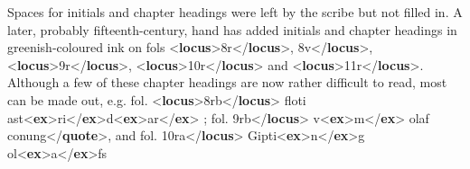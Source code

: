 \begin{shaded}
Spaces for initials and chapter headings were left by the scribe but not\mbox{}\newline 
\hspace*{1em}\hspace*{1em} filled in. A later, probably fifteenth-century, hand has added initials and\mbox{}\newline 
\hspace*{1em}\hspace*{1em} chapter headings in greenish-coloured ink on fols {<\textbf{locus}>}8r{</\textbf{locus}>},\mbox{}\newline 
{}8v{</\textbf{locus}>}, {<\textbf{locus}>}9r{</\textbf{locus}>}, {<\textbf{locus}>}10r{</\textbf{locus}>} and {<\textbf{locus}>}11r{</\textbf{locus}>}.\mbox{}\newline 
\hspace*{1em}\hspace*{1em} Although a few of these chapter headings are now rather difficult to read, most\mbox{}\newline 
\hspace*{1em}\hspace*{1em} can be made out, e.g. fol. {<\textbf{locus}>}8rb{</\textbf{locus}>}\mbox{}\newline 
\hspace*{1em}floti ast{<\textbf{ex}>}ri{</\textbf{ex}>}d{<\textbf{ex}>}ar{</\textbf{ex}>}\mbox{}\newline 
\hspace*{1em}; fol.\mbox{}\newline 
{}9rb{</\textbf{locus}>}\mbox{}\newline 
\hspace*{1em}v{<\textbf{ex}>}m{</\textbf{ex}>} olaf conung{</\textbf{quote}>}, and fol.\mbox{}\newline 
{}10ra{</\textbf{locus}>}\mbox{}\newline 
\hspace*{1em}Gipti{<\textbf{ex}>}n{</\textbf{ex}>}g ol{<\textbf{ex}>}a{</\textbf{ex}>}fs\mbox{}\newline 

\end{shaded}
